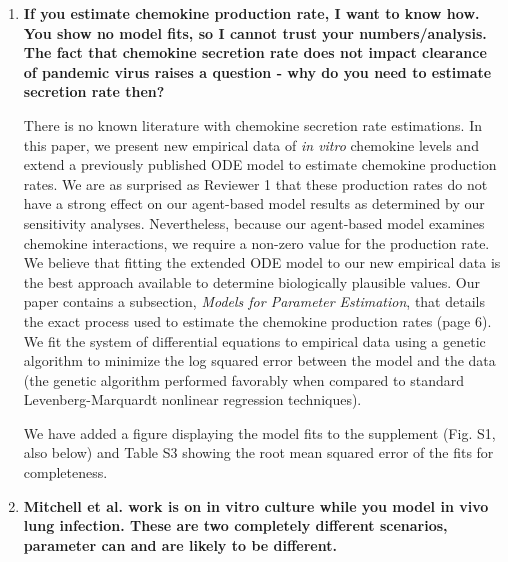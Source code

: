 \documentclass[10pt]{article}
\newenvironment{response}{\fontfamily{cmr}}{\par}
\begin{document}
\begin{enumerate}

\item \textbf{If you estimate chemokine production rate, I want to know how. You show no 
model fits, so I cannot trust your numbers/analysis. The fact that chemokine 
secretion rate does not impact clearance of pandemic virus raises a question -
why do you need to estimate secretion rate then?}

\begin{response}

There is no known literature with chemokine secretion rate estimations.  In this paper, we present new empirical data of \textit{in vitro} chemokine levels and extend a previously published ODE model to estimate chemokine production rates.  We are as surprised as Reviewer 1 that these production rates do not have a strong effect on our agent-based model results as determined by our sensitivity analyses.  Nevertheless, because our agent-based model examines chemokine interactions, we require a non-zero value for the production rate.  We believe that fitting the extended ODE model to our new empirical data is the best approach available to determine biologically plausible values.  Our paper contains a subsection, \textit{Models for Parameter Estimation}, that details the exact process used to estimate the chemokine production rates (page 6).  We fit the system of differential equations to empirical data using a genetic algorithm to minimize the log squared error between the model and the data (the genetic algorithm performed favorably when compared to standard Levenberg-Marquardt nonlinear regression techniques).  

We have added a figure displaying the model fits to the supplement (Fig. S1, also below) and Table S3 showing the root mean squared error of the fits for completeness.


%

\end{response}

\item \textbf{Mitchell et al. work is on in vitro culture while you model in vivo lung 
infection. These are two completely different scenarios, parameter can and are 
likely to be different.}


\end{enumerate}
\end{document}

